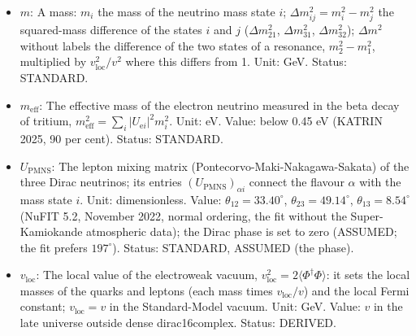 \documentclass[
  10pt,
]{article}
\begin{document}
\begin{itemize}
  density, a difference of two squared masses, or an addition to an
  effective number of species). Status: STANDARD.
\item
  \(m\): A mass: \(m_i\) the mass of the neutrino mass state \(i\);
  \(\Delta m_{ij}^2 = m_i^2 - m_j^2\) the squared-mass difference of the
  states \(i\) and \(j\) (\(\Delta m_{21}^2\), \(\Delta m_{31}^2\),
  \(\Delta m_{32}^2\)); \(\Delta m^2\) without labels the difference of
  the two states of a resonance, \(m_2^2 - m_1^2\), multiplied by
  \(v_{\mathrm{loc}}^2/v^2\) where this differs from 1. Unit: GeV.
  Status: STANDARD.
\item
  \(m_{\mathrm{eff}}\): The effective mass of the electron neutrino
  measured in the beta decay of tritium,
  \(m_{\mathrm{eff}}^2 = \sum_i\lvert U_{\mathrm{e}i}\rvert^2m_i^2\).
  Unit: eV. Value: below 0.45 eV (KATRIN 2025, 90 per cent). Status:
  STANDARD.
\item
  \(U_{\mathrm{PMNS}}\): The lepton mixing matrix
  (Pontecorvo-Maki-Nakagawa-Sakata) of the three Dirac neutrinos; its
  entries \((U_{\mathrm{PMNS}})_{\alpha i}\) connect the flavour
  \(\alpha\) with the mass state \(i\). Unit: dimensionless. Value:
  \(\theta_{12} = 33.40^\circ\), \(\theta_{23} = 49.14^\circ\),
  \(\theta_{13} = 8.54^\circ\) (NuFIT 5.2, November 2022, normal
  ordering, the fit without the Super-Kamiokande atmospheric data); the
  Dirac phase is set to zero (ASSUMED; the fit prefers \(197^\circ\)).
  Status: STANDARD, ASSUMED (the phase).
\item
  \(v_{\mathrm{loc}}\): The local value of the electroweak vacuum,
  \(v_{\mathrm{loc}}^2 = 2\langle\Phi^\dagger\Phi\rangle\): it sets the
  local masses of the quarks and leptons (each mass times
  \(v_{\mathrm{loc}}/v\)) and the local Fermi constant;
  \(v_{\mathrm{loc}} = v\) in the Standard-Model vacuum. Unit: GeV.
  Value: \(v\) in the late universe outside dense dirac16complex.
  Status: DERIVED.
\end{itemize}
\end{document}
